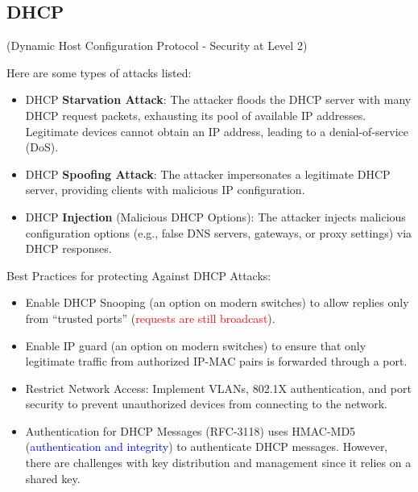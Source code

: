 \begin{center}
    \section{DHCP}
    (Dynamic Host Configuration Protocol - Security at Level 2)
\end{center}
Here are some types of attacks listed:
\begin{itemize}
    \item DHCP \textbf{Starvation Attack}: The attacker floods the DHCP server with many DHCP request packets, exhausting its pool of available IP addresses. Legitimate devices cannot obtain an IP address, leading to a denial-of-service (DoS).
    \item DHCP \textbf{Spoofing Attack}: The attacker impersonates a legitimate DHCP server, providing clients with malicious IP configuration.
    \item DHCP \textbf{Injection} (Malicious DHCP Options): The attacker injects malicious configuration options (e.g., false DNS servers, gateways, or proxy settings) via DHCP responses.
\end{itemize}

Best Practices for protecting Against DHCP Attacks:
\begin{itemize}
    \item Enable DHCP Snooping (an option on modern switches) to allow replies only from “trusted ports” (\textcolor{red}{requests are still broadcast}).
    \item Enable IP guard (an option on modern switches) to ensure that only legitimate traffic from authorized IP-MAC pairs is forwarded through a port.
    \item Restrict Network Access: Implement VLANs, 802.1X authentication, and port security to prevent unauthorized devices from connecting to the network.
    \item Authentication for DHCP Messages (RFC-3118) uses HMAC-MD5 (\textcolor{Blue}{authentication and integrity}) to authenticate DHCP messages. However, there are challenges with key distribution and management since it relies on a shared key.
\end{itemize}



















